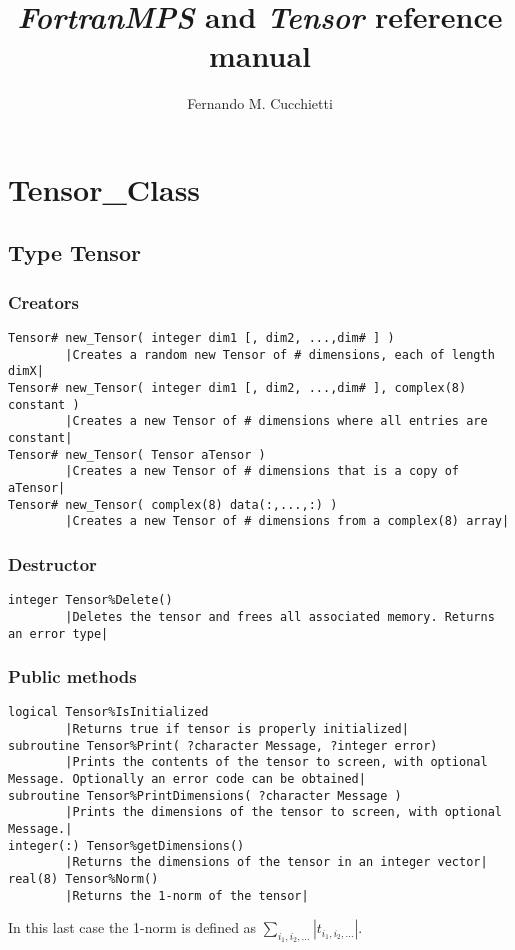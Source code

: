\documentclass[12pt]{article}
\title{{\em FortranMPS} and {\em Tensor} reference manual}
\author{Fernando M. Cucchietti}
\date{} %
\begin{document}
\maketitle


\section{Tensor\_Class}
\subsection{Type Tensor}

\subsubsection{Creators}

\begin{lstlisting}
Tensor# new_Tensor( integer dim1 [, dim2, ...,dim# ] )
		|Creates a random new Tensor of # dimensions, each of length dimX|
Tensor# new_Tensor( integer dim1 [, dim2, ...,dim# ], complex(8) constant )
		|Creates a new Tensor of # dimensions where all entries are constant|
Tensor# new_Tensor( Tensor aTensor )
		|Creates a new Tensor of # dimensions that is a copy of aTensor|
Tensor# new_Tensor( complex(8) data(:,...,:) )
		|Creates a new Tensor of # dimensions from a complex(8) array|
\end{lstlisting}

\subsubsection{Destructor}

\begin{lstlisting}
integer Tensor%Delete()
		|Deletes the tensor and frees all associated memory. Returns an error type|
\end{lstlisting}

\subsubsection{Public methods}

\begin{lstlisting}
logical Tensor%IsInitialized
		|Returns true if tensor is properly initialized|
subroutine Tensor%Print( ?character Message, ?integer error)
		|Prints the contents of the tensor to screen, with optional Message. Optionally an error code can be obtained|
subroutine Tensor%PrintDimensions( ?character Message )
		|Prints the dimensions of the tensor to screen, with optional Message.|
integer(:) Tensor%getDimensions()
		|Returns the dimensions of the tensor in an integer vector|
real(8) Tensor%Norm()
		|Returns the 1-norm of the tensor|
\end{lstlisting}
In this last case the 1-norm is defined as $\sum_{i_1,i_2,...} |t_{i_1,i_2,...}|$.
\end{document}
